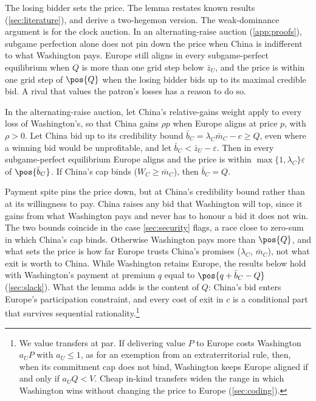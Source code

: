 The losing bidder sets the price. The lemma restates known results (\cref{sec:literature}), and \citet[Supplement B.2]{clayton2026framework} derive a two-hegemon version. The weak-dominance argument is for the clock auction. In an alternating-raise auction (\cref{app:proofs}), subgame perfection alone does not pin down the price when China is indifferent to what Washington pays. Europe still aligns in every subgame-perfect equilibrium when $Q$ is more than one grid step below $\bar z_U$, and the price is within one grid step of $\pos{Q}$ when the losing bidder bids up to its maximal credible bid. A rival that values the patron's losses has a reason to do so.

\begin{remark}\label{rem:spite}
In the alternating-raise auction, let China's relative-gains weight apply to every loss of Washington's, so that China gains $\rho p$ when Europe aligns at price $p$, with $\rho>0$. Let China bid up to its credibility bound $\bar b_C=\lambda_C\bar m_C-c\ge Q$, even where a winning bid would be unprofitable, and let $\bar b_C<\bar z_U-\varepsilon$. Then in every subgame-perfect equilibrium Europe aligns and the price is within $\max\{1,\lambda_C\}\varepsilon$ of $\pos{\bar b_C}$. If China's cap binds ($W_C\ge\bar m_C$), then $\bar b_C=Q$.
\end{remark}

Payment spite pins the price down, but at China's credibility bound rather than at its willingness to pay. China raises any bid that Washington will top, since it gains from what Washington pays and never has to honour a bid it does not win. The two bounds coincide in the case \cref{sec:security} flags, a race close to zero-sum in which China's cap binds. Otherwise Washington pays more than $\pos{Q}$, and what sets the price is how far Europe trusts China's promises ($\lambda_C$, $\bar m_C$), not what exit is worth to China. While Washington retains Europe, the results below hold with Washington's payment at premium $q$ equal to $\pos{q+\bar b_C-Q}$ (\cref{sec:slack}). What the lemma adds is the content of $Q$: China's bid enters Europe's participation constraint, and every cost of exit in $c$ is a conditional part that survives sequential rationality.\footnote{We value transfers at par. If delivering value $P$ to Europe costs Washington $a_U P$ with $a_U\le 1$, as for an exemption from an extraterritorial rule, then, when its commitment cap does not bind, Washington keeps Europe aligned if and only if $a_U Q<V$. Cheap in-kind transfers widen the range in which Washington wins without changing the price to Europe (\cref{sec:coding}).}

